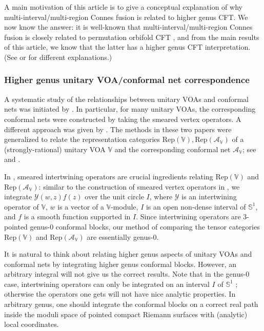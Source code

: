 \documentclass[12pt,a4paper,notitlepage]{article}
\theoremstyle{definition}
\theoremstyle{plain}
\newcommand{\mc}{\mathcal}
\newcommand{\Rep}{\mathrm{Rep}}
\newcommand{\mbb}{\mathbb}
\newcommand{\Vbb}{\mathbb V}
\numberwithin{equation}{subsection}
\begin{document}
A main motivation of this article is to give a conceptual explanation of why multi-interval/multi-region Connes fusion is related to higher genus CFT. We now know the answer: it is well-known that multi-interval/multi-region Connes fusion is closely related to permutation orbifold CFT \cite{LX04,KLX05}, and from the main results of this article, we know that the latter has a higher genus CFT interpretation. (See \cite{BDH17} or \cite{LX19} for different explanations.)



\subsubsection*{Higher genus unitary VOA/conformal net correspondence}


A systematic study of the relationships between unitary VOAs and conformal nets was initiated by \cite{CKLW18}. In particular, for many unitary VOAs, the corresponding conformal nets were constructed by taking the smeared vertex operators. A different approach was given by \cite{Ten19a}. The methods in these two papers were generalized to relate the representation categories $\Rep(\Vbb),\Rep(\mc A_\Vbb)$ of a (strongly-rational) unitary VOA $\Vbb$ and the corresponding conformal net $\mc A_\Vbb$; see \cite{Ten19b,Ten19c} and \cite{Gui21a,Gui20a}. 

In \cite{Gui21a,Gui20a}, smeared intertwining operators are   crucial ingredients relating $\Rep(\Vbb)$ and $\Rep(\mc A_\Vbb)$: similar to the construction of smeared vertex operators in \cite{CKLW18}, we integrate $\mc Y(w,z)f(z)$ over the unit circle $I$, where $\mc Y$ is an intertwining operator of $\Vbb$, $w$ is a vector of a $\Vbb$-module, $I$ is an open non-dense interval of $\mbb S^1$, and $f$ is a smooth function supported in $I$. Since intertwining operators are $3$-pointed genus-$0$ conformal blocks, our method of comparing the tensor categories $\Rep(\Vbb)$ and $\Rep(\mc A_\Vbb)$ are essentially genus-$0$.

It is natural to think about relating higher genus aspects of unitary VOAs and conformal nets by integrating higher genus conformal blocks. However, an arbitrary integral will not give us the correct results. Note that in the genus-$0$ case, intertwining operators can only be integrated on an interval $I$ of $\mbb S^1$ ; otherwise the operators one gets will not have nice analytic properties. In arbitrary genus, one should integrate the conformal blocks on a correct real path inside the moduli space of pointed compact Riemann surfaces with (analytic) local coordinates.
\end{document}
